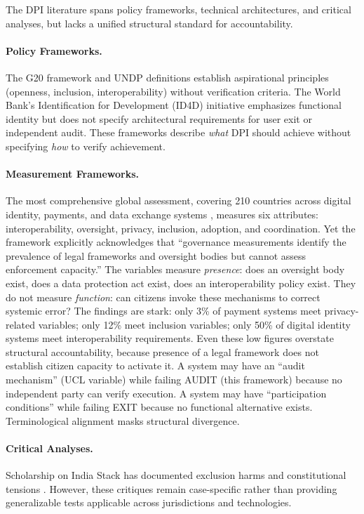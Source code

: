 \documentclass{article}
\begin{document}
The DPI literature spans policy frameworks, technical architectures, and critical analyses, but lacks a unified structural standard for accountability.

\paragraph{Policy Frameworks.} The G20 framework \citep{g20} and UNDP definitions \citep{undp} establish aspirational principles (openness, inclusion, interoperability) without verification criteria. The World Bank's Identification for Development (ID4D) initiative emphasizes functional identity but does not specify architectural requirements for user exit or independent audit. These frameworks describe \textit{what} DPI should achieve without specifying \textit{how} to verify achievement.

\paragraph{Measurement Frameworks.} The most comprehensive global assessment, covering 210 countries across digital identity, payments, and data exchange systems \citep{ucl2025}, measures six attributes: interoperability, oversight, privacy, inclusion, adoption, and coordination. Yet the framework explicitly acknowledges that ``governance measurements identify the prevalence of legal frameworks and oversight bodies but cannot assess enforcement capacity.'' The variables measure \textit{presence}: does an oversight body exist, does a data protection act exist, does an interoperability policy exist. They do not measure \textit{function}: can citizens invoke these mechanisms to correct systemic error? The findings are stark: only 3\% of payment systems meet privacy-related variables; only 12\% meet inclusion variables; only 50\% of digital identity systems meet interoperability requirements. Even these low figures overstate structural accountability, because presence of a legal framework does not establish citizen capacity to activate it. A system may have an ``audit mechanism'' (UCL variable) while failing AUDIT (this framework) because no independent party can verify execution. A system may have ``participation conditions'' while failing EXIT because no functional alternative exists. Terminological alignment masks structural divergence.

\paragraph{Critical Analyses.} Scholarship on India Stack has documented exclusion harms \citep{khera2019} and constitutional tensions \citep{bhatia2019}. However, these critiques remain case-specific rather than providing generalizable tests applicable across jurisdictions and technologies.
\end{document}
